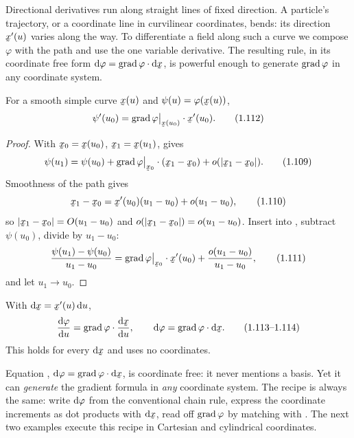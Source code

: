 Directional derivatives run along straight lines of fixed direction. A
particle's trajectory, or a coordinate line in curvilinear coordinates,
bends: its direction $\bx'(u)$ varies along the way. To differentiate a
field along such a curve we compose $\varphi$ with the path and use the one
variable derivative. The resulting rule, in its coordinate free form
$\dl\varphi=\grad\varphi\cdot\dl\bx$, is powerful enough to generate
$\operatorname{grad}\varphi$ in any coordinate system.

\begin{theorem}\label{thm:chain}
For a smooth simple curve $\bx(u)$ and $\psi(u)=\varphi(\bx(u))$,
\begin{equation}
\psi'(u_0)=\grad\varphi\rest{\bx(u_0)}\cdot\bx'(u_0). \tag{1.112}\label{eq:1.112}
\end{equation}
\end{theorem}

\begin{proof}
With $\bx_0=\bx(u_0)$, $\bx_1=\bx(u_1)$,  gives
\begin{equation}
\psi(u_1)=\psi(u_0)+\grad\varphi\rest{\bx_0}\cdot(\bx_1-\bx_0)
+o(|\bx_1-\bx_0|). \tag{1.109}\label{eq:1.109}
\end{equation}
Smoothness of the path gives
\begin{equation}
\bx_1-\bx_0=\bx'(u_0)(u_1-u_0)+o(u_1-u_0), \tag{1.110}\label{eq:1.110}
\end{equation}
so $|\bx_1-\bx_0|=O(u_1-u_0)$ and $o(|\bx_1-\bx_0|)=o(u_1-u_0)$. Insert
 into , subtract $\psi(u_0)$, divide by $u_1-u_0$:
\begin{equation}
\frac{\psi(u_1)-\psi(u_0)}{u_1-u_0}
=\grad\varphi\rest{\bx_0}\cdot\bx'(u_0)+\frac{o(u_1-u_0)}{u_1-u_0}, \tag{1.111}\label{eq:1.111}
\end{equation}
and let $u_1\to u_0$.
\end{proof}

\begin{corollary}\label{cor:dphi}
With $\dl\bx=\bx'(u)\,\dl u$,
\begin{equation}
\frac{\dl\varphi}{\dl u}=\grad\varphi\cdot\frac{\dl\bx}{\dl u},
\qquad \dl\varphi=\grad\varphi\cdot\dl\bx. \tag{1.113--1.114}\label{eq:1.113}
\end{equation}
This holds for every $\dl\bx$ and uses no coordinates.
\end{corollary}

\begin{remark}\label{rem:dphi}
Equation , $\dl\varphi=\grad\varphi\cdot\dl\bx$, is coordinate free:
it never mentions a basis. Yet it can \emph{generate} the gradient formula
in \emph{any} coordinate system. The recipe is always the same: write
$\mathrm{d}\varphi$ from the conventional chain rule, express the coordinate
increments as dot products with $\dl\bx$, read off $\operatorname{grad}\varphi$ by
matching with . The next two examples execute this recipe in
Cartesian and cylindrical coordinates.
\end{remark}

